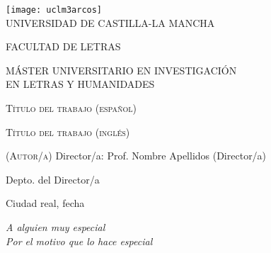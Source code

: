 \begin{titlepage}
    \begin{center}
        {\texttt{[image: uclm3arcos]}}\\[0.4cm]
        {\LARGE UNIVERSIDAD DE CASTILLA-LA MANCHA}
        \vspace{1cm}
        {\par\Large FACULTAD DE LETRAS} 
        \vspace{0.6cm}
    {\par\textsc{MÁSTER UNIVERSITARIO EN INVESTIGACIÓN\\ 
    EN LETRAS Y HUMANIDADES}}
	\vfill
    {\huge\textsc{Título del trabajo (español)}}\par
    \bigskip
    \parbox{.6\linewidth}{}
    \bigskip
    \par{\Large\textsc{Título del trabajo (inglés)}}
    \par\vspace{2cm}
    \textsc{(Autor/a)}
    \medbreak
    Director/a: Prof. Nombre Apellidos (Director/a)\par
    Depto. del Director/a\par
    \vspace{4cm}
    \noindent%
    Ciudad real, fecha
    \end{center}
    \vfill
    \par\noindent\makebox[2.5in]{\hrulefill} \hfill\makebox[2.5in]{\hrulefill}%
    \par\noindent{}      
    \hfill{}%
\end{titlepage}


\null{}
\begin{flushright}
\emph{A alguien muy especial\\
Por el motivo que lo hace especial}
\end{flushright}
\null
\cleardoublepage